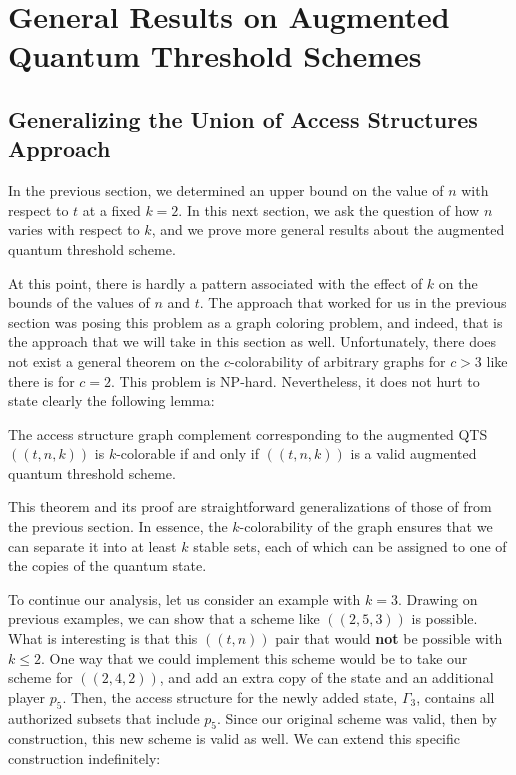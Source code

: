 \chapter{General Results on Augmented Quantum Threshold Schemes}

\section{Generalizing the Union of Access Structures Approach}

In the previous section, we determined an upper bound on the value of $n$ with respect to $t$ at a fixed $k=2$. In this next section, we ask the question of how $n$ varies with respect to $k$, and we prove more general results about the augmented quantum threshold scheme. 

At this point, there is hardly a pattern associated with the effect of $k$ on the bounds of the values of $n$ and $t$. The approach that worked for us in the previous section was posing this problem as a graph coloring problem, and indeed, that is the approach that we will take in this section as well. Unfortunately, there does not exist a general theorem on the $c$-colorability of arbitrary graphs for $c > 3$ like there is for $c=2$. This problem is NP-hard. Nevertheless, it does not hurt to state clearly the following lemma:

\begin{lemma}
    \label{lem:k-color-access}
    The access structure graph complement corresponding to the augmented QTS $((t,n,k))$ is $k$-colorable if and only if $((t,n,k))$ is a valid augmented quantum threshold scheme.
\end{lemma}

This theorem and its proof are straightforward generalizations of those of  from the previous section. In essence, the $k$-colorability of the graph ensures that we can separate it into at least $k$ stable sets, each of which can be assigned to one of the copies of the quantum state.

To continue our analysis, let us consider an example with $k=3$. Drawing on previous examples, we can show that a scheme like $((2,5,3))$ is possible. What is interesting is that this $((t,n))$ pair that would \textbf{not} be possible with $k \leq 2$. One way that we could implement this scheme would be to take our scheme for $((2,4,2))$, and add an extra copy of the state and an additional player $p_5$. Then, the access structure for the newly added state, $\Gamma_3$, contains all authorized subsets that include $p_5$. Since our original scheme was valid, then by construction, this new scheme is valid as well. We can extend this specific construction indefinitely:

